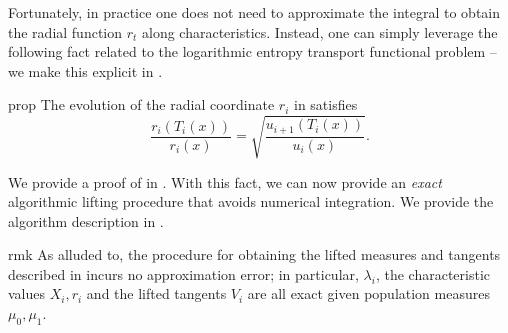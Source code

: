 \documentclass[11pt]{article}
\begin{document}
Fortunately, in practice one does not need to approximate the integral to obtain the radial function $r_t$ along characteristics. Instead, one can simply leverage the following fact related to the logarithmic entropy transport functional problem -- we make this explicit in . 

\begin{restatable}{prop}{} \label{radial update}
    The evolution of the radial coordinate $r_i$ in  satisfies 
    \[\frac{r_i(T_i(x))}{r_i(x)} = \sqrt{\frac{u_{i+1}(T_i(x))}{u_i(x)}}.\]
\end{restatable}
We provide a proof of  in . With this fact, we can now provide an \textit{exact} algorithmic lifting procedure that avoids numerical integration. We provide the algorithm description in  .

\begin{restatable}{rmk}{}
    As alluded to, the procedure for obtaining the lifted measures  and tangents described in  incurs no approximation error; in particular, $\lambda_i$, the characteristic values $X_i, r_i$ and the lifted tangents $V_i$ are all exact given population measures $\mu_0, \mu_1$. 
\end{restatable}
\end{document}
